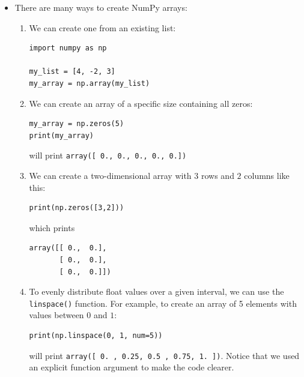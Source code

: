 \documentclass[a4paper,twoside,titlepage]{memoir}
\newcommand{\shellcmd}{\texttt}
\begin{document}
\begin{itemize}
\item There are many ways to create NumPy arrays:
\begin{enumerate}
\item We can create one from an existing list:
\begin{verbatim}
import numpy as np

my_list = [4, -2, 3]
my_array = np.array(my_list)
\end{verbatim}

\item We can create an array of a specific size containing all zeros:
\begin{verbatim}
my_array = np.zeros(5)
print(my_array)
\end{verbatim}
will print \shellcmd{array([ 0.,  0.,  0.,  0.,  0.])}

\item We can create a two-dimensional array with $3$ rows and $2$ columns like this:
\begin{verbatim}
print(np.zeros([3,2]))
\end{verbatim}
which prints
\begin{verbatim}
array([[ 0.,  0.],
       [ 0.,  0.],
       [ 0.,  0.]])
\end{verbatim}

\item To evenly distribute float values over a given interval, we can use the \shellcmd{linspace()} function.  For example, to create an array of 5 elements with values between $0$ and $1$:
\begin{verbatim}
print(np.linspace(0, 1, num=5))
\end{verbatim}
will print \shellcmd{array([ 0.  ,  0.25,  0.5 ,  0.75,  1.  ])}.  Notice that we used an explicit function argument to make the code clearer.
\end{enumerate}
\end{itemize}
\end{document}

